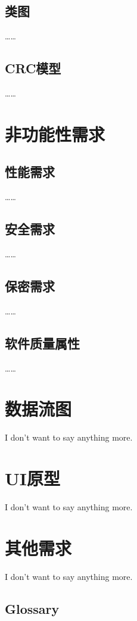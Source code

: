 \section{类图}

……

\section{CRC模型}

……


\newpage


\chapter{非功能性需求}
\label{ch:nonfunctional}

\section{性能需求}

……

\section{安全需求}

……

\section{保密需求}

……

\section{软件质量属性}

……


\newpage


\chapter{数据流图}

I don't want to say anything more.


\newpage


\chapter{UI原型}

I don't want to say anything more.


\newpage


\chapter{其他需求}

I don't want to say anything more.

\newpage



\begin{appendices}
\chapter{Glossary}


\end{appendices}


